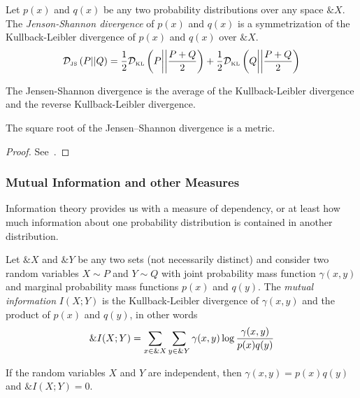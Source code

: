 \begin{definition}
  \label{def:jsd}
  Let $p(x)$ and $q(x)$ be any two probability distributions over any space
  $\&X$. The \textit{Jenson-Shannon divergence} of $p(x)$ and $q(x)$ is a
  symmetrization of the Kullback-Leibler divergence of $p(x)$ and $q(x)$ over
  $\&X$.
  \begin{align}
    \mathcal{D}_{\text{\tiny JS}}\left(P\middle|\middle|Q\right) = {1 \over 2} \mathcal{D}_{\text{\tiny KL}}\left( P \middle| \middle| P + Q \over 2 \right) + {1 \over 2} \mathcal{D}_{\text{\tiny KL}}\left( Q \middle| \middle| P + Q
    \over 2 \right)
  \end{align}
\end{definition}
\begin{remark}
  The Jensen-Shannon divergence is the average of the Kullback-Leibler
  divergence and the reverse Kullback-Leibler divergence.
\end{remark}

\begin{theorem}
  The square root of the Jensen–Shannon divergence is a metric.
\end{theorem}
\begin{proof}
  See~\cite{ref:endres-2003}.
\end{proof}

\subsubsection{Mutual Information and other Measures}

Information theory provides us with a measure of dependency, or at least how
much information about one probability distribution is contained in another
distribution.

\begin{definition}
  Let $\&X$ and $\&Y$ be any two sets (not necessarily distinct) and consider
  two random variables $X \sim P$ and $Y \sim Q$ with joint probability mass
  function $\gamma(x,y)$ and marginal probability mass functions $p(x)$ and
  $q(y)$. The \textit{mutual information} $I(X;Y)$ is the Kullback-Leibler
  divergence of $\gamma(x,y)$ and the product of $p(x)$ and $q(y)$, in other
  words
  \begin{align}
    \label{eq:mutual-information}
    \&I(X; Y) = \sum_{x \in \&X}\sum_{y \in \&Y}\gamma(x, y) \log{{\gamma(x, y) \over p(x)q(y)}}
  \end{align}
\end{definition}

\begin{theorem}
  If the random variables $X$ and $Y$ are independent, then $\gamma(x,y) = p(x)q(y)$
  and $\&I(X; Y) = 0$.
\end{theorem}

